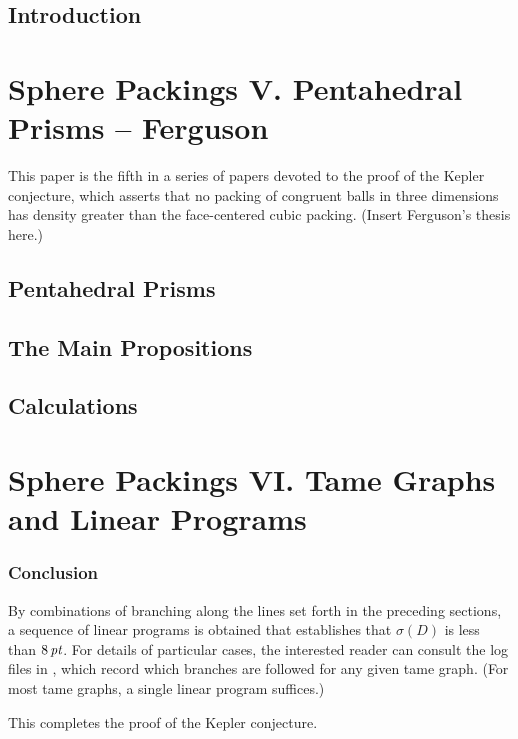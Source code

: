\documentclass[onecolumn]{newsiambook}
\def\shortversion#1{#1}
\def\longversion#1{}
\def\shortversion#1{}
\def\longversion#1{#1}
\begin{document}
\longversion{ %
	\label{part:ferguson}
    	\chapter*{Introduction}
    	\part{Sphere Packings V. Pentahedral Prisms -- Ferguson}
    This paper is the fifth in a series of papers devoted to the proof
of the Kepler conjecture, which asserts that no packing of congruent
balls in three dimensions has density greater than the face-centered
cubic packing.
(Insert Ferguson's thesis here.)
   \chapter{Pentahedral Prisms} 
   \chapter{The Main Propositions}
   \chapter{Calculations}
    }



\longversion{
    \part{Sphere Packings VI. Tame Graphs and Linear Programs}
    \label{part:tame}
    
    
    
    
    }

\shortversion{
    \label{part:tame}
    
    
    }

\section{Conclusion}

By combinations of branching along the lines set forth in the
preceding sections, a sequence of linear programs is obtained that
establishes that  $\sigma(D)$ is less than $8\,\hbox{\it pt}$.  For details
of particular cases, the interested reader can consult the log
files in \cite{web}, which record which branches are followed for
any given tame graph.  (For most tame graphs, a single linear
program suffices.)

\smallskip

This completes the \shortversion{(abridged)} proof of the Kepler
conjecture.


\backmatter



\printindex
\end{document}
